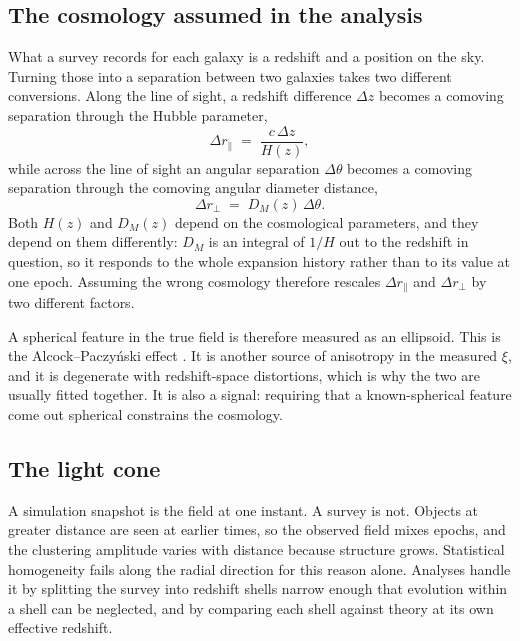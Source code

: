 \documentclass[12pt]{article}
\begin{document}
\subsection{The cosmology assumed in the analysis}
\label{sec:ap}

What a survey records for each galaxy is a redshift and a position on the
sky.  Turning those into a separation between two galaxies takes two
different conversions.  Along the line of sight, a redshift difference
$\Delta z$ becomes a comoving separation through the Hubble parameter,
\begin{equation}
  \Delta r_\parallel \;=\; \frac{c\,\Delta z}{H(z)} ,
  \label{eq:ap-radial}
\end{equation}
while across the line of sight an angular separation $\Delta\theta$
becomes a comoving separation through the comoving angular diameter
distance,
\begin{equation}
  \Delta r_\perp \;=\; D_M(z)\,\Delta\theta .
  \label{eq:ap-transverse}
\end{equation}
Both $H(z)$ and $D_M(z)$ depend on the cosmological parameters, and they
depend on them differently: $D_M$ is an integral of $1/H$ out to the
redshift in question, so it responds to the whole expansion history
rather than to its value at one epoch.  Assuming the wrong cosmology
therefore rescales $\Delta r_\parallel$ and $\Delta r_\perp$ by two
different factors.

A spherical feature in the true field is therefore measured as an
ellipsoid.  This is the Alcock--Paczy\'nski effect
\citep{AlcockPaczynski1979}.  It is another source of anisotropy in the
measured $\xi$, and it is degenerate with redshift-space distortions,
which is why the two are usually fitted together.  It is also a signal:
requiring that a known-spherical feature come out spherical constrains
the cosmology.

\subsection{The light cone}
\label{sec:lightcone}

A simulation snapshot is the field at one instant.  A survey is not.
Objects at greater distance are seen at earlier times, so the observed
field mixes epochs, and the clustering amplitude varies with distance
because structure grows.  Statistical homogeneity fails along the radial
direction for this reason alone.  Analyses handle it by splitting the
survey into redshift shells narrow enough that evolution within a shell
can be neglected, and by comparing each shell against theory at its own
effective redshift.
\end{document}
